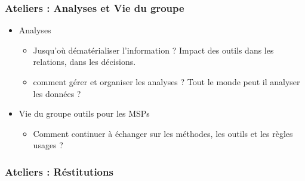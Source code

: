 \begin{frame}
\frametitle{Ateliers : Analyses et Vie du groupe}

\begin{itemize}

\item Analyses
	\begin{itemize}
		\item Jusqu'où dématérialiser l'information ? Impact des outils dans les relations, dans les décisions.
	\item comment gérer et organiser les analyses ?	 Tout le monde peut il analyser les données ?
	\end{itemize}

\vfill

\item Vie du groupe outils pour les MSPs
	\begin{itemize}
	\item Comment continuer à échanger sur les méthodes, les outils et les règles usages ?	
	\end{itemize}

\end{itemize}

\end{frame}


\begin{frame}
\frametitle{Ateliers : Réstitutions}

\end{frame}



